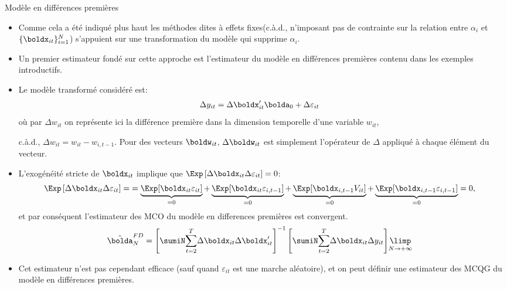 \begin{frame}[allowframebreaks]{Modèle en différences premières}
    \begin{itemize}
        \item Comme cela a été indiqué plus haut les méthodes dites à effets fixes(c.à.d., 
        n'imposant pas de contrainte sur la relation entre $\alpha_i$ et $\{\boldx_{it}\}_{i=1}^N$) 
        s'appuient sur une transformation du modèle qui supprime $\alpha_i$. 
        \item Un premier estimateur fondé sur cette approche est l'estimateur du modèle en différences 
        premières contenu dans les exemples introductifs.
        \item  Le modèle transformé considéré est:
        \begin{align*}
        \Delta y_{it} &= \Delta \boldx_{it}^\prime \bolda_0 + \Delta \varepsilon_{it}
        \end{align*}
        où par $\Delta w_{it}$ on représente ici
        la différence première dans la dimension temporelle d'une variable $w_{it}$,
        
        c.à.d., $\Delta w_{it} = w_{it}-w_{i, t-1}$. Pour des vecteurs $\boldw_{it}$, $\Delta\boldw_{it}$ 
        est simplement l'opérateur de $\Delta$ appliqué à chaque élément du vecteur.

        \item L'exogénéité stricte de $\boldx_{it}$ implique que $ \Exp\left[ \Delta \boldx_{it}  \Delta \varepsilon_{it}\right] = 0$:
        \begin{align*}
        \Exp\left[\Delta \boldx_{it}  \Delta \varepsilon_{it}\right] =&=\underbrace{\Exp[\boldx_{it} \varepsilon_{it}]}_{=0} 
        + \underbrace{\Exp[\boldx_{it} \varepsilon_{i, t-1}]}_{=0} + \underbrace{\Exp[\boldx_{i, t-1} V_{it}]}_{=0}  +  
        \underbrace{\Exp[\boldx_{i, t-1} \varepsilon_{i, t-1}]}_{=0}=0,
        \end{align*}
        et par conséquent l'estimateur des MCO du modèle en differences premières est convergent.
        \begin{align*}
        \hat{\bolda}^{FD}_N = 
        \left[\sumiN \underset{t=2}{\overset{T}{\sum}}\Delta \boldx_{it} \Delta \boldx_{it}^\prime\right]^{-1}
        \left[\sumiN \underset{t=2}{\overset{T}{\sum}}\Delta \boldx_{it} \Delta y_{it}\right] &\underset{N\to +\infty}{\limp}
        \end{align*}
        \item Cet estimateur n'est pas cependant efficace (sauf quand $\varepsilon_{it}$ est une marche aléatoire), 
        et on peut définir une estimateur des MCQG du modèle en différences premières.
    \end{itemize}
\end{frame}

